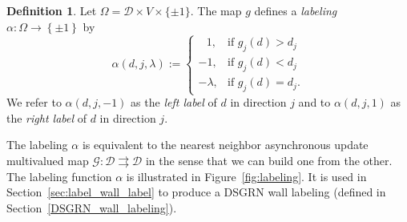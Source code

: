 \documentclass[12pt, notitlepage]{amsart}
\newcommand{\setof}[1]{\left\{ {#1}\right\}}
\newcommand{\cD}{\mathcal{D}}
\newcommand{\cG}{{\mathcal G}}
\theoremstyle{definition}
\newtheorem{defn}[thm]{Definition}
\begin{document}
  \begin{defn}
    \label{def:multilevel_labeling}
    Let $\Omega = \cD \times V \times \{\pm 1\}$. The map $g$ defines a \emph{labeling} $\alpha \colon \Omega \to \setof{\pm 1}$ by
    \[
      \alpha(d, j, \lambda) :=
      \begin{cases}
        \;\;\, 1, & \text{if } g_j(d) > d_j \\
        -1,       & \text{if } g_j(d) < d_j \\
        -\lambda, & \text{if } g_j(d) = d_j.
      \end{cases}
    \]
    We refer to $\alpha(d, j, -1)$ as the \emph{left label} of $d$ in direction $j$ and to $\alpha(d, j, 1)$ as the \emph{right label} of $d$ in direction $j$.
  \end{defn}

  The labeling $\alpha$ is equivalent to the nearest neighbor asynchronous update multivalued map $\cG \colon \cD \rightrightarrows \cD$ in the sense that we can build one from the other. The labeling function $\alpha$ is illustrated in Figure~\ref{fig:labeling}. It is used in Section~\ref{sec:label_wall_label} to produce a DSGRN wall labeling (defined in Section~\ref{DSGRN_wall_labeling}).
\end{document}
